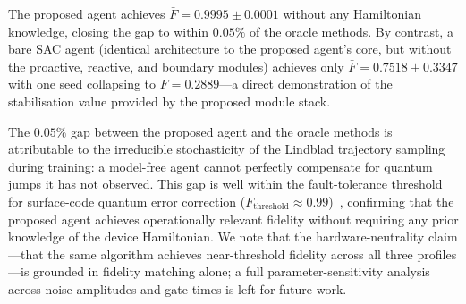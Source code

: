 The proposed agent achieves $\bar{F} = 0.9995 \pm 0.0001$ without any
Hamiltonian knowledge, closing the gap to within $0.05\%$ of the
oracle methods.
By contrast, a bare SAC agent (identical architecture to the proposed agent's
core, but without the proactive, reactive, and boundary modules)
achieves only $\bar{F} = 0.7518 \pm 0.3347$ with one seed
collapsing to $F = 0.2889$---a direct demonstration of the
stabilisation value provided by the proposed module stack.

\begin{table}[ht]
\centering
\caption{Classical pulse-optimisation baselines vs. the proposed agent on the
  \texttt{simos\_nominal} profile (5 seeds each).
  GRAPE and CRAB are granted full Hamiltonian and noise-model access;
  Both the proposed agent and bare SAC are model-free.
  $\bar{F}$ is the mean gate fidelity over 5 seeds;
  $F_\text{NR}$ is the noise-robust fidelity evaluated under the
  full Lindblad master equation.
  $\Delta F$ is the absolute deviation from the GRAPE oracle.}
\label{tab:baselines}
\end{table}

The $0.05\%$ gap between the proposed agent and the oracle methods is
attributable to the irreducible stochasticity of the Lindblad
trajectory sampling during training: a model-free agent cannot
perfectly compensate for quantum jumps it has not observed.
This gap is well within the fault-tolerance threshold for
surface-code quantum error correction
($F_\text{threshold} \approx 0.99$)~\cite{Fowler2012},
confirming that the proposed agent achieves operationally relevant fidelity
without requiring any prior knowledge of the device Hamiltonian.
We note that the hardware-neutrality claim---that the same algorithm achieves
near-threshold fidelity across all three profiles---is grounded in fidelity
matching alone; a full parameter-sensitivity analysis across noise amplitudes
and gate times is left for future work.


